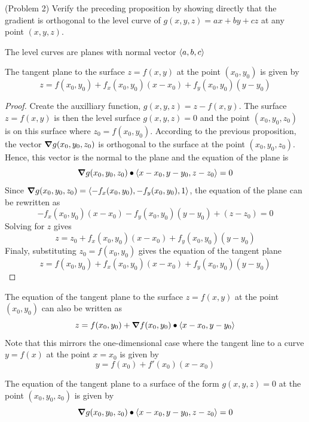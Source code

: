 \documentclass[handout]{ximera}
\begin{document}
\begin{problem}(Problem 2)
Verify the preceding proposition by showing directly that the 
gradient is orthogonal to the level curve  
of $g(x,y, z) = ax + by + cz$ at any point $(x,y, z)$.
\begin{hint}
The level curves are planes with normal vector $\left\langle a, b, c\right\rangle$
\end{hint}
\end{problem}


\begin{theorem}
The tangent plane to the surface $z = f(x,y)$ at the point $(x_0, y_0)$ is given by
\[
z = f(x_0, y_0) + f_x(x_0, y_0)(x - x_0) + f_y(x_0, y_0)(y - y_0)
\]
\end{theorem}
\begin{proof}
Create the auxilliary function, $g(x,y,z) = z - f(x,y)$.
The surface $z = f(x,y)$ is then the level surface $g(x,y,z) = 0$ 
and the point $(x_0, y_0, z_0)$ is on this surface where $z_0 = f(x_0, y_0)$.
According to the previous proposition, the vector $\boldsymbol\nabla g(x_0, y_0, z_0)$ is 
orthogonal to the surface at the point $(x_0, y_0, z_0)$.
Hence, this vector is the normal to the plane and the equation of the plane is
\[
\boldsymbol\nabla g(x_0, y_0, z_0) \bullet \left\langle x- x_0, y-y_0, z-z_0\right\rangle = 0
\]
Since $\boldsymbol\nabla g(x_0, y_0, z_0) = \left\langle -f_x(x_0, y_0), -f_y(x_0, y_0), 1\right\rangle$, 
the equation of the plane can be rewritten as
\[
-f_x(x_0, y_0)(x-x_0) - f_y(x_0, y_0)(y-y_0) + (z-z_0) = 0
\]
Solving for $z$ gives
\[
z = z_0 + f_x(x_0, y_0)(x-x_0) + f_y(x_0, y_0)(y-y_0)
\]
Finaly, substituting $z_0 = f(x_0, y_0)$ gives the equation of the tangent plane
\[
z = f(x_0, y_0) + f_x(x_0, y_0)(x-x_0) + f_y(x_0, y_0)(y-y_0)
\]
\end{proof}

\begin{remark}
The equation of the tangent plane to the surface $z = f(x, y)$ at 
the point $(x_0, y_0)$ can also be written as
\[
z = f(x_0, y_0) + \boldsymbol\nabla f(x_0,y_0) \bullet \left\langle x - x_0, y-y_0\right\rangle
\] 
Note that this mirrors the one-dimensional case where the tangent line to a curve 
$y = f(x)$ at the point $x= x_0$ is given by
\[
y = f(x_0) + f'(x_0)(x - x_0)
\]
\end{remark}


\begin{corollary}
The equation of the tangent plane to a surface of the form $g(x, y, z) = 0$ at 
the point $(x_0, y_0, z_0)$ is given by
\[
\boldsymbol\nabla g(x_0, y_0, z_0) \bullet \left\langle x - x_0, y - y_0, z - z_0\right\rangle = 0
\]
\end{corollary}
\end{document}
